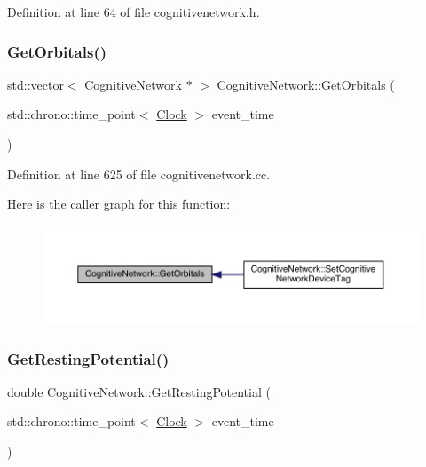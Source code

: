 Definition at line 64 of file cognitivenetwork.\+h.

\mbox{\label{class_cognitive_network_aa21d28ffc3b507236a7dad64663f6c42}} 
\subsubsection{\texorpdfstring{Get\+Orbitals()}{GetOrbitals()}}
{\footnotesize\ttfamily std\+::vector$<$ \hyperlink{class_cognitive_network}{Cognitive\+Network} $\ast$ $>$ Cognitive\+Network\+::\+Get\+Orbitals (\begin{DoxyParamCaption}\item[{std\+::chrono\+::time\+\_\+point$<$ \hyperlink{universe_8h_a0ef8d951d1ca5ab3cfaf7ab4c7a6fd80}{Clock} $>$}]{event\+\_\+time }\end{DoxyParamCaption})}



Definition at line 625 of file cognitivenetwork.\+cc.

Here is the caller graph for this function\+:
\nopagebreak
\begin{figure}[H]
\begin{center}
\leavevmode
\includegraphics[width=350pt]{class_cognitive_network_aa21d28ffc3b507236a7dad64663f6c42_icgraph}
\end{center}
\end{figure}
\mbox{\label{class_cognitive_network_a03d744f9d0d420c1e044646bc6bd2552}} 
\subsubsection{\texorpdfstring{Get\+Resting\+Potential()}{GetRestingPotential()}}
{\footnotesize\ttfamily double Cognitive\+Network\+::\+Get\+Resting\+Potential (\begin{DoxyParamCaption}\item[{std\+::chrono\+::time\+\_\+point$<$ \hyperlink{universe_8h_a0ef8d951d1ca5ab3cfaf7ab4c7a6fd80}{Clock} $>$}]{event\+\_\+time }\end{DoxyParamCaption})\hspace{0.3cm}{\ttfamily [inline]}}



